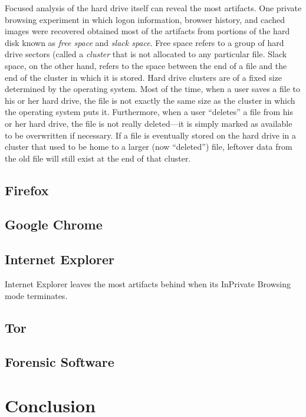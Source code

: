 \documentclass[pdftex,letterpaper,titlepage,12pt]{article}
\begin{document}
    Focused analysis of the hard drive itself can reveal the most artifacts.
    One private browsing experiment in which logon information, browser
    history, and cached images were recovered obtained most of the artifacts
    from portions of the hard disk known as \emph{free space} and \emph{slack
    space}. Free space refers to a group of hard drive sectors (called a
    \emph{cluster} that is not allocated to any particular file. Slack space, 
    on the other hand, refers to the space between the end of a file and the 
    end of the cluster in which it is stored. Hard drive clusters are of a 
    fixed size determined by the operating system. Most of the time, when a 
    user saves a file to his or her hard drive, the file is not exactly the
    same size as the cluster in which the operating system puts it.
    Furthermore, when a user ``deletes'' a file from his or her hard drive, the
    file is not really deleted---it is simply marked as available to be
    overwritten if necessary. If a file is eventually stored on the hard drive
    in a cluster that used to be home to a larger (now ``deleted'') file,
    leftover data from the old file will still exist at the end of that
    cluster.

    \subsection{Firefox}


    \subsection{Google Chrome}


    \subsection{Internet Explorer}
    Internet Explorer leaves the most artifacts behind when its InPrivate
    Browsing mode terminates.\cite{ohana13} 

    \subsection{Tor}


    \subsection{Forensic Software}

  \section{Conclusion}
\end{document}
